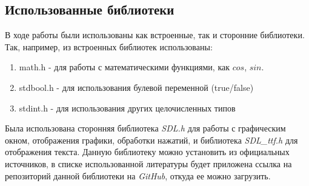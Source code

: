 \documentclass[14pt]{extarticle}
\begin{document}
{\begin{spacing}{1.5}
    {
        \par
        \subsection{Использованные библиотеки}
        \par
    }

    В ходе работы были использованы как встроенные, так и сторонние библиотеки. Так, например, из встроенных библиотек использованы:
    \par
    \begin{enumerate}[itemsep=2pt, parsep=0pt, topsep=3pt]
        \item{math.h - для работы с математическими функциями, как $cos$, $sin$.}
        \item{stdbool.h - для использования булевой переменной (true/false)}
        \item{stdint.h - для использования других целочисленных типов}
    \end{enumerate}
    \par
    Была использована сторонняя библиотека \textit{SDL.h} для работы с графическим окном, отображения графики, обработки нажатий, и библиотека \textit{SDL\_ttf.h} для отображения текста. Данную библиотеку можно установить из официальных источников, в списке использованной литературы будет приложена ссылка на репозиторий данной библиотеки на \textit{GitHub}, откуда ее можно загрузить.
    \par
    \vfill
    \newpage
    \end{spacing}
}
\end{document}

